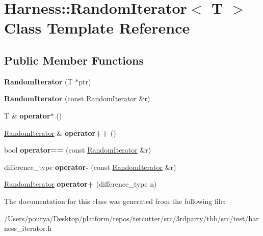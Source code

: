 \hypertarget{classHarness_1_1RandomIterator}{}\section{Harness\+:\+:Random\+Iterator$<$ T $>$ Class Template Reference}
\label{classHarness_1_1RandomIterator}
\subsection*{Public Member Functions}
\begin{DoxyCompactItemize}
\item 
\hypertarget{classHarness_1_1RandomIterator_af07fdefb662bb46004c71724176d2b35}{}{\bfseries Random\+Iterator} (T $\ast$ptr)\label{classHarness_1_1RandomIterator_af07fdefb662bb46004c71724176d2b35}

\item 
\hypertarget{classHarness_1_1RandomIterator_a66074c6349632e832223a2c881d29b0d}{}{\bfseries Random\+Iterator} (const \hyperlink{classHarness_1_1RandomIterator}{Random\+Iterator} \&r)\label{classHarness_1_1RandomIterator_a66074c6349632e832223a2c881d29b0d}

\item 
\hypertarget{classHarness_1_1RandomIterator_a4991fb134c969988ec74da30287b85d8}{}T \& {\bfseries operator$\ast$} ()\label{classHarness_1_1RandomIterator_a4991fb134c969988ec74da30287b85d8}

\item 
\hypertarget{classHarness_1_1RandomIterator_ab8a5cf0e2d02949843e611979814cb4f}{}\hyperlink{classHarness_1_1RandomIterator}{Random\+Iterator} \& {\bfseries operator++} ()\label{classHarness_1_1RandomIterator_ab8a5cf0e2d02949843e611979814cb4f}

\item 
\hypertarget{classHarness_1_1RandomIterator_a04892da5f900e96e2aa3aacb0ade3921}{}bool {\bfseries operator==} (const \hyperlink{classHarness_1_1RandomIterator}{Random\+Iterator} \&r)\label{classHarness_1_1RandomIterator_a04892da5f900e96e2aa3aacb0ade3921}

\item 
\hypertarget{classHarness_1_1RandomIterator_aea8773724459e8ad1d6b528926523b90}{}difference\+\_\+type {\bfseries operator-\/} (const \hyperlink{classHarness_1_1RandomIterator}{Random\+Iterator} \&r)\label{classHarness_1_1RandomIterator_aea8773724459e8ad1d6b528926523b90}

\item 
\hypertarget{classHarness_1_1RandomIterator_abf7ac0a22a15ccee607c2f5d82053d9a}{}\hyperlink{classHarness_1_1RandomIterator}{Random\+Iterator} {\bfseries operator+} (difference\+\_\+type n)\label{classHarness_1_1RandomIterator_abf7ac0a22a15ccee607c2f5d82053d9a}

\end{DoxyCompactItemize}


The documentation for this class was generated from the following file\+:\begin{DoxyCompactItemize}
\item 
/\+Users/pourya/\+Desktop/platform/repos/tetcutter/src/3rdparty/tbb/src/test/harness\+\_\+iterator.\+h\end{DoxyCompactItemize}
